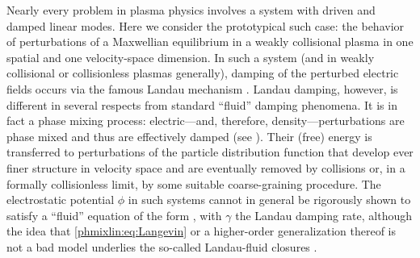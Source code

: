 Nearly every problem in plasma physics involves a system with 
driven and damped linear modes. Here we consider the prototypical 
such case: the behavior of perturbations of a Maxwellian equilibrium 
in a weakly collisional plasma in one spatial and one velocity-space dimension.
In such a system (and in weakly collisional or collisionless plasmas generally), 
damping of the perturbed electric fields occurs via the famous Landau 
mechanism \cite{landau46}. Landau damping, however, is different in several respects from 
standard ``fluid'' damping phenomena. It is in fact a phase mixing process: 
electric---and, therefore, density---perturbations are phase mixed 
and thus are effectively damped (see ). Their (free) energy is transferred 
to perturbations of the particle distribution function that develop 
ever finer structure in velocity space and are eventually removed by 
collisions or, in a formally collisionless limit, by some suitable coarse-graining procedure.  
The electrostatic potential $\phi$ in such systems cannot in general be 
rigorously shown to satisfy a ``fluid'' equation of the form , 
with $\gamma$ the Landau damping rate, although the idea that \eqref{phmixlin:eq:Langevin} 
or a higher-order generalization thereof 
is not a bad model underlies the so-called Landau-fluid closures 
\cite{hammett90,hammett92,hedrick92,dorland93,beer96,snyder97,snyder01,snyder01gf,passot04,goswami05,ramos05,passot06,passot07,passot12}. 

